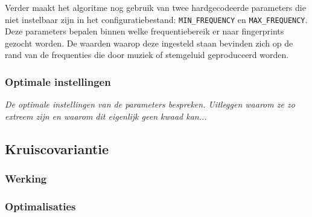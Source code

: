 Verder maakt het algoritme nog gebruik van twee hardgecodeerde parameters die niet instelbaar zijn in het configuratiebestand: \texttt{MIN\_FREQUENCY} en \texttt{MAX\_FREQUENCY}. Deze parameters bepalen binnen welke frequentiebereik er naar fingerprints gezocht worden. De waarden waarop deze ingesteld staan bevinden zich op de rand van de frequenties die door muziek of stemgeluid geproduceerd worden.

\subsubsection{Optimale instellingen}

\textit{De optimale instellingen van de parameters bespreken. Uitleggen waarom ze zo extreem zijn en waarom dit eigenlijk geen kwaad kan...}


\subsection{Kruiscovariantie}


\subsubsection{Werking}



\subsubsection{Optimalisaties}

